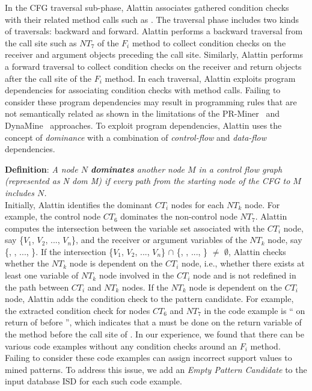 In the CFG traversal sub-phase, Alattin associates gathered condition checks with their related method calls such as . The traversal phase includes two kinds of traversals: backward and forward. Alattin performs a backward traversal from the call site such as $NT_7$ of the $F_i$ method to collect condition checks on the receiver and argument objects preceding the call site. Similarly, Alattin performs a forward traversal to collect condition checks on the receiver and return objects after the call site of the $F_i$ method. In each traversal, Alattin exploits program dependencies for associating condition checks with method calls. Failing to consider these program dependencies may result in programming rules that are not semantically related as shown in the limitations of the PR-Miner~\cite{Zhenmin2005PRMiner} and DynaMine~\cite{livshits05dynamine} approaches. To exploit program dependencies, Alattin uses the concept of \emph{dominance} with a combination of \emph{control-flow} and \emph{data-flow} dependencies.

\textbf{Definition}: \emph{A node $N$ \textbf{dominates} another node $M$ in a control flow graph (represented as N dom M) if every path from the starting node of the CFG to $M$ includes $N$.}\\

Initially, Alattin identifies the dominant $CT_i$ nodes for each $NT_k$ node. For example, the control node $CT_6$ dominates the non-control node $NT_7$. Alattin computes the intersection between the variable set associated with the $CT_i$ node, say \{$V_1$, $V_2$, ..., $V_n$\}, and the receiver or argument variables of the $NT_k$ node, say \{, , ..., \}. If the intersection  \{$V_1$, $V_2$, ..., $V_n$\} $\cap$ \{, , ..., \} $\neq$ $\emptyset$, Alattin checks whether the $NT_k$ node is dependent on the $CT_i$ node, i.e., whether there exists at least one variable of $NT_k$ node involved in the $CT_i$ node and is not redefined in the path between $CT_i$ and $NT_k$ nodes. If the $NT_k$ node is dependent on the $CT_i$ node, Alattin adds the condition check to the pattern candidate. For example, the extracted condition check for nodes $CT_6$ and $NT_7$ in the code example is `` on return of  before '', which indicates that a  must be done on the return variable of the  method before the call site of .  In our experience, we found that there can be various code examples without any condition checks around an $F_i$ method. Failing to consider these code examples can assign incorrect support values to mined patterns. To address this issue, we add an \emph{Empty Pattern Candidate} to the input database ISD for each such code example.
